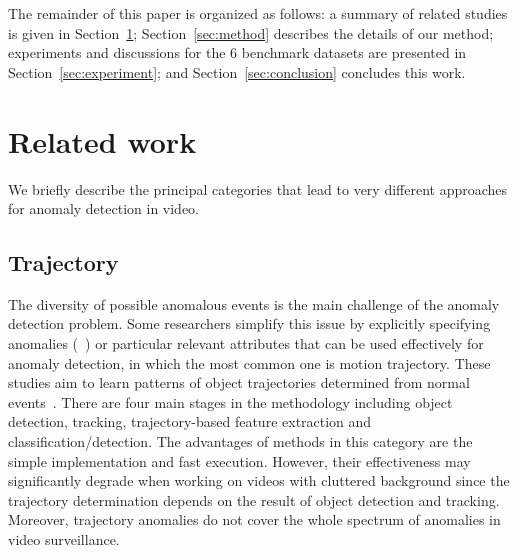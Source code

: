 \documentclass[10pt,twocolumn,letterpaper]{article}
\begin{document}
The remainder of this paper is organized as follows: a summary of related studies is given in Section~\ref{sec:related}; Section~\ref{sec:method} describes the details of our method; experiments and discussions for the 6 benchmark datasets are presented in Section~\ref{sec:experiment}; and Section~\ref{sec:conclusion} concludes this work.

\section{Related work}\label{sec:related}
We briefly describe the principal categories that lead to very different approaches for anomaly detection in video.

\subsection{Trajectory}
The diversity of possible anomalous events is the main challenge of the anomaly detection problem. Some researchers simplify this issue by explicitly specifying anomalies (\eg~\cite{Sultani2018}) or particular relevant attributes that can be used effectively for anomaly detection, in which the most common one is motion trajectory. These studies aim to learn patterns of object trajectories determined from normal events~\cite{Medioni2001Event,Basharat2008Learning,Piciarelli2008Trajectory,Zhang2009Learning}. There are four main stages in the methodology including object detection, tracking, trajectory-based feature extraction and classification/detection. The advantages of methods in this category are the simple implementation and fast execution. However, their effectiveness may significantly degrade when working on videos with cluttered background since the trajectory determination depends on the result of object detection and tracking. Moreover, trajectory anomalies do not cover the whole spectrum of anomalies in video surveillance.
\end{document}
